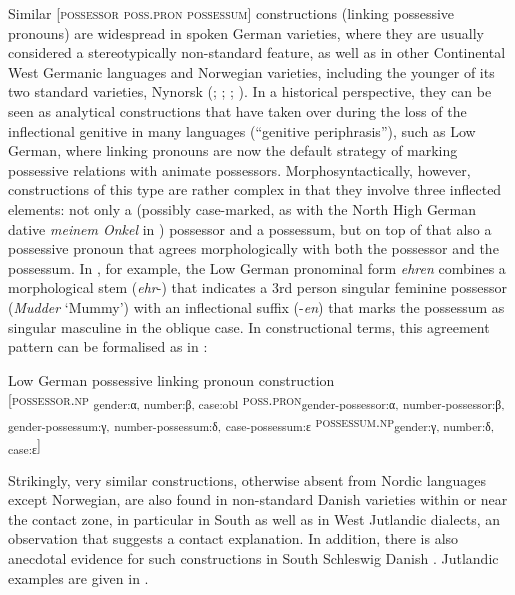 \documentclass[output=paper]{langsci/langscibook}
\begin{document}
Similar {[}\textsc{possessor} \textsc{poss.pron} \textsc{possessum}{]} constructions (linking possessive pronouns) are widespread in spoken German varieties, where they are usually considered a stereotypically non-standard feature, as well as in other Continental West Germanic languages and Norwegian varieties, including the younger of its two standard varieties, Nynorsk (\citealt[963]{KoptjevskajaTamm.2001}; \citealt[158--161]{Harbert.2007}; \citealt[107--121]{Hoder.2016a}; \citealt[229--230]{Gunleifsen.2011}). In a historical perspective, they can be seen as analytical constructions that have taken over during the loss of the inflectional genitive in many languages (“genitive periphrasis”), such as Low German, where linking pronouns are now the default strategy of marking possessive relations with animate possessors. Morphosyntactically, however, constructions of this type are rather complex in that they involve three inflected elements: not only a (possibly case-marked, as with the North High German dative \textit{meinem Onkel} in ) possessor and a possessum, but on top of that also a possessive pronoun that agrees morphologically with both the possessor and the possessum. In , for example, the Low German pronominal form \textit{ehren} combines a morphological stem (\textit{ehr}-) that indicates a 3rd person singular feminine possessor (\textit{Mudder} ‘Mummy’) with an inflectional suffix (-\textit{en}) that marks the possessum as singular masculine in the oblique case. In constructional terms, this agreement pattern can be formalised as in :

\ea\label{ex:hoeder:16}
	Low German possessive linking pronoun construction\\
     {[}\textsc{possessor.np} \textsubscript{gender:α, number:β, case:obl} \textsc{poss.pron}\textsubscript{gender-possessor:α,} \textsubscript{number-possessor:β,} \textsubscript{gender-possessum:γ,} \textsubscript{number-possessum:δ,} \textsubscript{case-possessum:ɛ} \textsc{possessum.np}\textsubscript{gender:γ, number:δ, case:ɛ}{]}
     \z
     
\largerpage[-1]
Strikingly, very similar constructions, otherwise absent from Nordic languages except Norwegian, are also found in non-standard Danish varieties within or near the contact zone, in particular in South as well as in West Jutlandic dialects, an observation that suggests a contact explanation. In addition, there is also anecdotal evidence for such constructions in South Schleswig Danish \citep{Christophersen.1985}. Jutlandic examples are given in .
\end{document}
